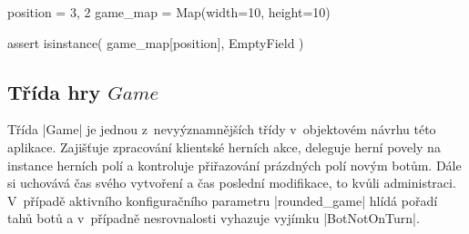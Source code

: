 \begin{code}[caption={Přetížené indexování třídy $Map$},label={lst:map-indexing}]
position = 3, 2
game_map = Map(width=10, height=10)

assert isinstance(
	game_map[position],
	EmptyField
)
\end{code}

\subsection{Třída hry $Game$}

Třída \ic|Game| je jednou z~nevyýznamnějších třídy v~objektovém návrhu této aplikace. Zajišťuje zpracování klientské herních akce, deleguje herní povely na instance herních polí a kontroluje přiřazování prázdných polí novým botům. Dále si uchovává čas svého vytvoření a čas poslední modifikace, to kvůli administraci. V~případě aktivního konfiguračního parametru \ic|rounded_game| hlídá pořadí tahů botů a v~případně nesrovnalosti vyhazuje vyjímku \ic|BotNotOnTurn|.

